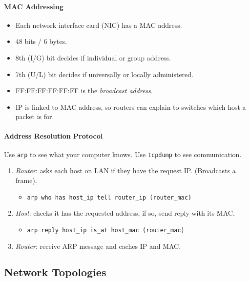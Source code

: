 \documentclass[twocolumn,english]{article}
\begin{document}
\paragraph{MAC Addressing}
\begin{itemize}
\item Each network interface card (NIC) has a MAC address.
\item 48 bits / 6 bytes.
\item 8th (I/G) bit decides if individual or group address.
\item 7th (U/L) bit decides if universally or locally administered.
\item FF:FF:FF:FF:FF:FF is the \emph{broadcast address}.
\item IP is linked to MAC address, so routers can explain to switches which
host a packet is for.
\end{itemize}

\paragraph{Address Resolution Protocol}

Use \texttt{arp} to see what your computer knows. Use \texttt{tcpdump}
to see communication.
\begin{enumerate}
\item \emph{Router}: asks each host on LAN if they have the request IP.
(Broadcasts a frame).
\begin{itemize}
\item \texttt{arp who has host\_ip tell router\_ip (router\_mac)}
\end{itemize}
\item \emph{Host}: checks it has the requested address, if so, send reply
with its MAC.
\begin{itemize}
\item \texttt{arp reply host\_ip is\_at host\_mac (router\_mac)}
\end{itemize}
\item \emph{Router}: receive ARP message and caches IP and MAC.
\end{enumerate}

\subsection{Network Topologies}
\end{document}
